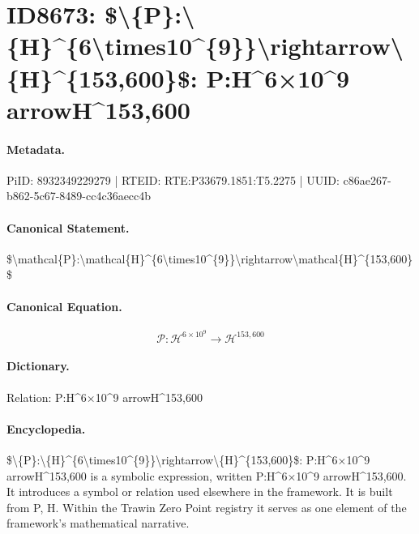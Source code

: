 \section*{ID8673: \$\textbackslash{}\{P\}:\textbackslash{}\{H\}\textasciicircum{}\{6\textbackslash{}times10\textasciicircum{}\{9\}\}\textbackslash{}rightarrow\textbackslash{}\{H\}\textasciicircum{}\{153,600\}\$: P:H\textasciicircum{}6×10\textasciicircum{}9 arrowH\textasciicircum{}153,600}
\paragraph{Metadata.}
PiID: 8932349229279 | RTEID: RTE:P33679.1851:T5.2275 | UUID: c86ae267-b862-5c67-8489-cc4c36aecc4b

\paragraph{Canonical Statement.}
\$\textbackslash{}mathcal\{P\}:\textbackslash{}mathcal\{H\}\textasciicircum{}\{6\textbackslash{}times10\textasciicircum{}\{9\}\}\textbackslash{}rightarrow\textbackslash{}mathcal\{H\}\textasciicircum{}\{153,600\}\$

\paragraph{Canonical Equation.}
\[
\mathcal{P}:\mathcal{H}^{6\times10^{9}}\rightarrow\mathcal{H}^{153,600}
\]

\paragraph{Dictionary.}
Relation: P:H\textasciicircum{}6×10\textasciicircum{}9 arrowH\textasciicircum{}153,600

\paragraph{Encyclopedia.}
\$\textbackslash{}\{P\}:\textbackslash{}\{H\}\textasciicircum{}\{6\textbackslash{}times10\textasciicircum{}\{9\}\}\textbackslash{}rightarrow\textbackslash{}\{H\}\textasciicircum{}\{153,600\}\$: P:H\textasciicircum{}6×10\textasciicircum{}9 arrowH\textasciicircum{}153,600 is a symbolic expression, written P:H\textasciicircum{}6×10\textasciicircum{}9 arrowH\textasciicircum{}153,600. It introduces a symbol or relation used elsewhere in the framework. It is built from P, H. Within the Trawin Zero Point registry it serves as one element of the framework's mathematical narrative.
